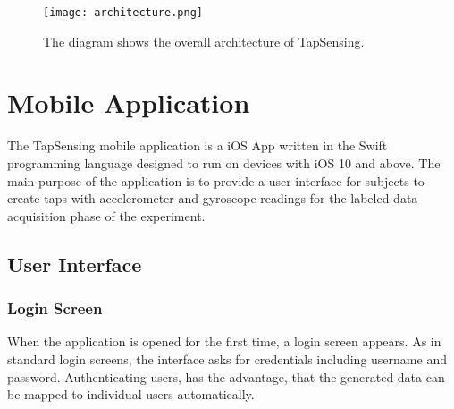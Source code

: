 \begin{figure}[h!]
  \centering
  \texttt{[image: architecture.png]}
  \caption{The diagram shows the overall architecture of TapSensing.} \label{fig:architecture}
\end{figure}



\section{Mobile Application}
The TapSensing mobile application is a iOS App written in the Swift programming language designed to run on devices with iOS 10 and above. The main purpose of the application is to provide a user interface for subjects to create taps with accelerometer and gyroscope readings for the labeled data acquisition phase of the experiment.
\label{sec:mobileapp}

\subsection{User Interface}
\subsubsection{Login Screen}
When the application is opened for the first time, a login screen appears. As in standard login screens, the interface asks for credentials including username and password. Authenticating users, has the advantage, that the generated data can be mapped to individual users automatically.
